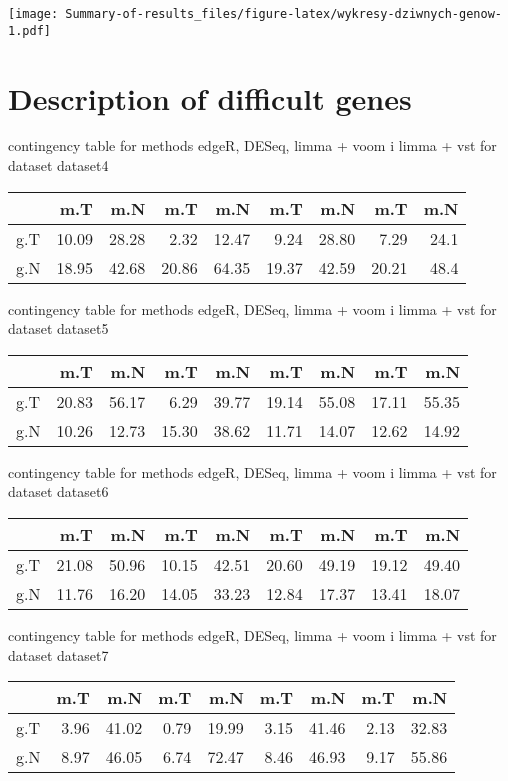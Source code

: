 \documentclass[
  11pt,
]{article}
\begin{document}
\texttt{[image: Summary-of-results\_files/figure-latex/wykresy-dziwnych-genow-1.pdf]}

\hypertarget{description}{%
\section{Description of difficult genes}\label{description}}

contingency table for methods edgeR, DESeq, limma + voom i limma + vst for dataset dataset4

\begin{tabular}{l|r|r|r|r|r|r|r|r}
\hline
  & m.T & m.N & m.T & m.N & m.T & m.N & m.T & m.N\\
\hline
g.T & 10.09 & 28.28 & 2.32 & 12.47 & 9.24 & 28.80 & 7.29 & 24.1\\
\hline
g.N & 18.95 & 42.68 & 20.86 & 64.35 & 19.37 & 42.59 & 20.21 & 48.4\\
\hline
\end{tabular}

contingency table for methods edgeR, DESeq, limma + voom i limma + vst for dataset dataset5

\begin{tabular}{l|r|r|r|r|r|r|r|r}
\hline
  & m.T & m.N & m.T & m.N & m.T & m.N & m.T & m.N\\
\hline
g.T & 20.83 & 56.17 & 6.29 & 39.77 & 19.14 & 55.08 & 17.11 & 55.35\\
\hline
g.N & 10.26 & 12.73 & 15.30 & 38.62 & 11.71 & 14.07 & 12.62 & 14.92\\
\hline
\end{tabular}

contingency table for methods edgeR, DESeq, limma + voom i limma + vst for dataset dataset6

\begin{tabular}{l|r|r|r|r|r|r|r|r}
\hline
  & m.T & m.N & m.T & m.N & m.T & m.N & m.T & m.N\\
\hline
g.T & 21.08 & 50.96 & 10.15 & 42.51 & 20.60 & 49.19 & 19.12 & 49.40\\
\hline
g.N & 11.76 & 16.20 & 14.05 & 33.23 & 12.84 & 17.37 & 13.41 & 18.07\\
\hline
\end{tabular}

contingency table for methods edgeR, DESeq, limma + voom i limma + vst for dataset dataset7

\begin{tabular}{l|r|r|r|r|r|r|r|r}
\hline
  & m.T & m.N & m.T & m.N & m.T & m.N & m.T & m.N\\
\hline
g.T & 3.96 & 41.02 & 0.79 & 19.99 & 3.15 & 41.46 & 2.13 & 32.83\\
\hline
g.N & 8.97 & 46.05 & 6.74 & 72.47 & 8.46 & 46.93 & 9.17 & 55.86\\
\hline
\end{tabular}
\end{document}
